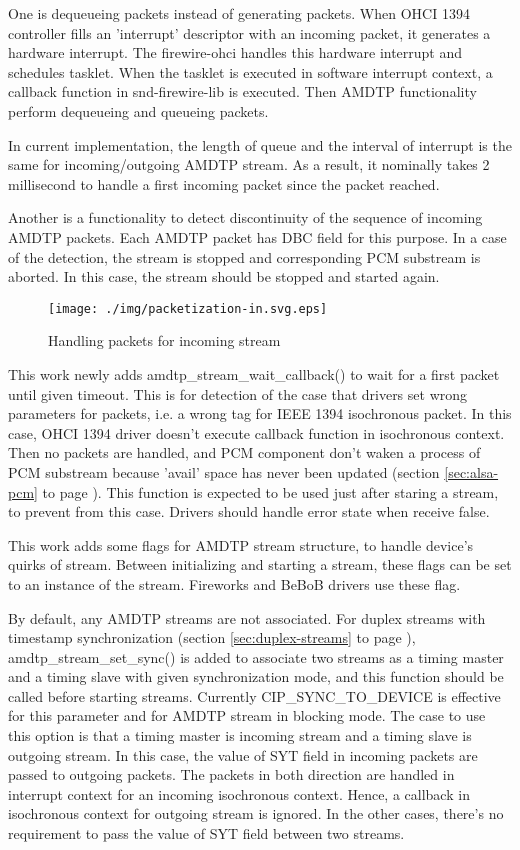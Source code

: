 \documentclass[onecolumn]{jarticle}
\begin{document}
One is dequeueing packets instead of generating packets. When OHCI 1394 controller fills an 'interrupt' descriptor with an incoming packet, it generates a hardware interrupt. The firewire-ohci handles this hardware interrupt and schedules tasklet. When the tasklet is executed in software interrupt context, a callback function in snd-firewire-lib is executed. Then AMDTP functionality perform dequeueing and queueing packets.

In current implementation, the length of queue and the interval of interrupt is the same for incoming/outgoing AMDTP stream. As a result, it nominally takes 2 millisecond to handle a first incoming packet since the packet reached.

Another is a functionality to detect discontinuity of the sequence of incoming AMDTP packets. Each AMDTP packet has DBC field for this purpose. In a case of the detection, the stream is stopped and corresponding PCM substream is aborted. In this case, the stream should be stopped and started again.

\begin{figure}[H]
	\centering
	\texttt{[image: ./img/packetization-in.svg.eps]}
	\caption{{Handling packets for incoming stream}}
	\label{fig:packetization-in}
\end{figure}

This work newly adds amdtp\_stream\_wait\_callback() to wait for a first packet until given timeout. This is for detection of the case that drivers set wrong parameters for packets, i.e. a wrong tag for IEEE 1394 isochronous packet. In this case, OHCI 1394 driver doesn't execute callback function in isochronous context. Then no packets are handled, and PCM component don't waken a process of PCM substream because 'avail' space has never been updated (section \ref{sec:alsa-pcm} to page \pageref{sec:alsa-pcm}). This function is expected to be used just after staring a stream, to prevent from this case. Drivers should handle error state when receive false.

This work adds some flags for AMDTP stream structure, to handle device's quirks of stream. Between initializing and starting a stream, these flags can be set to an instance of the stream. Fireworks and BeBoB drivers use these flag.

By default, any AMDTP streams are not associated. For duplex streams with timestamp synchronization (section \ref{sec:duplex-streams} to page \pageref{sec:duplex-streams}), amdtp\_stream\_set\_sync() is added to associate two streams as a timing master and a timing slave with given synchronization mode, and this function should be called before starting streams. Currently CIP\_SYNC\_TO\_DEVICE is effective for this parameter and for AMDTP stream in blocking mode. The case to use this option is that a timing master is incoming stream and a timing slave is outgoing stream. In this case, the value of SYT field in incoming packets are passed to outgoing packets. The packets in both direction are handled in interrupt context for an incoming isochronous context. Hence, a callback in isochronous context for outgoing stream is ignored. In the other cases, there's no requirement to pass the value of SYT field between two streams.
\end{document}
